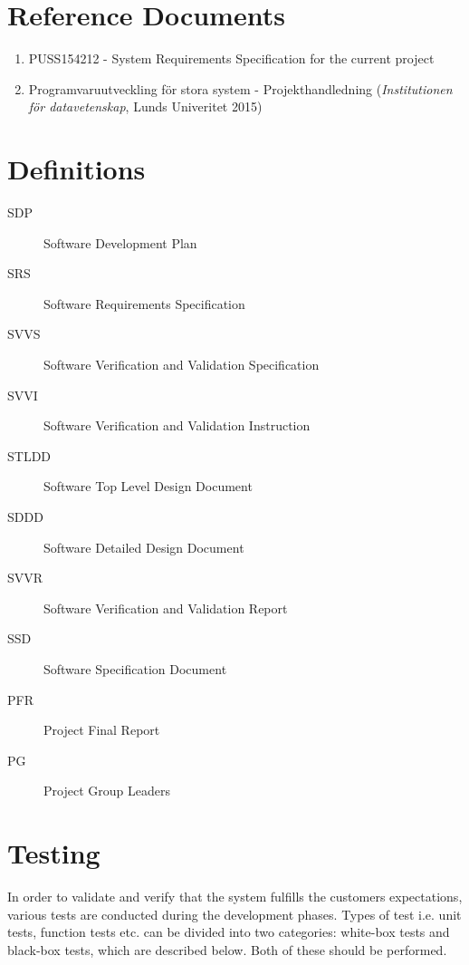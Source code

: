 \documentclass[a4paper]{article}
\begin{document}
\section{Reference Documents}
\begin{enumerate}
\item PUSS154212 - System Requirements Specification for the current project \label{refdocs:srs}
\item Programvaruutveckling för stora system - Projekthandledning (\textit{Institutionen för datavetenskap}, Lunds Univeritet 2015) \label{refdocs:projekthandledning}
\end{enumerate}

\section{Definitions}
\begin{description}
\item[SDP] Software Development Plan
\item[SRS] Software Requirements Specification
\item[SVVS] Software Verification and Validation Specification
\item[SVVI] Software Verification and Validation Instruction
\item[STLDD] Software Top Level Design Document
\item[SDDD] Software Detailed Design Document
\item[SVVR] Software Verification and Validation Report
\item[SSD] Software Specification Document
\item[PFR] Project Final Report
\item[PG] Project Group Leaders
\end{description}
\section{Testing}
In order to validate and verify that the system fulfills the customers expectations, various tests are conducted during the development phases. Types of test i.e. unit tests, function tests etc. can be divided into two categories: white-box tests and black-box tests, which are described below. Both of these should be performed.  
\end{document}
